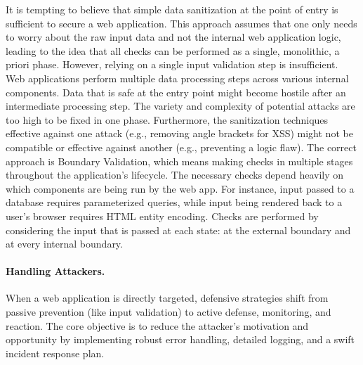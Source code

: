 \begin{itemize}
    It is tempting to believe that simple data sanitization at the point of entry is sufficient to secure a web application. This approach assumes that one only needs to worry about the raw input data and not the internal web application logic, leading to the idea that all checks can be performed as a single, monolithic, a priori phase. However, relying on a single input validation step is insufficient. Web applications perform multiple data processing steps across various internal components. Data that is safe at the entry point might become hostile after an intermediate processing step. The variety and complexity of potential attacks are too high to be fixed in one phase. Furthermore, the sanitization techniques effective against one attack (e.g., removing angle brackets for XSS) might not be compatible or effective against another (e.g., preventing a logic flaw). The correct approach is Boundary Validation, which means making checks in multiple stages throughout the application's lifecycle. The necessary checks depend heavily on which components are being run by the web app. For instance, input passed to a database requires parameterized queries, while input being rendered back to a user's browser requires HTML entity encoding. Checks are performed by considering the input that is passed at each state: at the external boundary and at every internal boundary.
\end{itemize}

\paragraph{Handling Attackers.} When a web application is directly targeted, defensive strategies shift from passive prevention (like input validation) to active defense, monitoring, and reaction. The core objective is to reduce the attacker's motivation and opportunity by implementing robust error handling, detailed logging, and a swift incident response plan.

